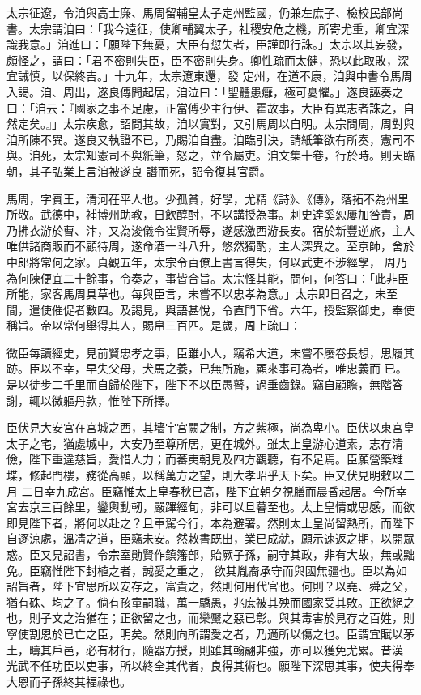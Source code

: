 \begin{pinyinscope}
 太宗征遼，令洎與高士廉、馬周留輔皇太子定州監國，仍兼左庶子、檢校民部尚書。太宗謂洎曰：「我今遠征，使卿輔翼太子，社稷安危之機，所寄尤重，卿宜深識我意。」洎進曰：「願陛下無憂，大臣有愆失者，臣謹即行誅。」太宗以其妄發，頗怪之，謂曰：「君不密則失臣，臣不密則失身。卿性疏而太健，恐以此取敗，深宜誡慎，以保終吉。」十九年，太宗遼東還，發
 定州，在道不康，洎與中書令馬周入謁。洎、周出，遂良傳問起居，洎泣曰：「聖體患癰，極可憂懼。」遂良誣奏之曰：「洎云：『國家之事不足慮，正當傅少主行伊、霍故事，大臣有異志者誅之，自然定矣。』」太宗疾愈，詔問其故，洎以實對，又引馬周以自明。太宗問周，周對與洎所陳不異。遂良又執證不已，乃賜洎自盡。洎臨引決，請紙筆欲有所奏，憲司不與。洎死，太宗知憲司不與紙筆，怒之，並令屬吏。洎文集十卷，行於時。則天臨朝，其子弘業上言洎被遂良
 譖而死，詔令復其官爵。



 馬周，字賓王，清河茌平人也。少孤貧，好學，尤精《詩》、《傳》，落拓不為州里所敬。武德中，補博州助教，日飲醇酎，不以講授為事。刺史達奚恕屢加咎責，周乃拂衣游於曹、汴，又為浚儀令崔賢所辱，遂感激西游長安。宿於新豐逆旅，主人唯供諸商販而不顧待周，遂命酒一斗八升，悠然獨酌，主人深異之。至京師，舍於中郎將常何之家。貞觀五年，太宗令百僚上書言得失，何以武吏不涉經學，
 周乃為何陳便宜二十餘事，令奏之，事皆合旨。太宗怪其能，問何，何答曰：「此非臣所能，家客馬周具草也。每與臣言，未嘗不以忠孝為意。」太宗即日召之，未至間，遣使催促者數四。及謁見，與語甚悅，令直門下省。六年，授監察御史，奉使稱旨。帝以常何舉得其人，賜帛三百匹。是歲，周上疏曰：



 微臣每讀經史，見前賢忠孝之事，臣雖小人，竊希大道，未嘗不廢卷長想，思履其跡。臣以不幸，早失父母，犬馬之養，已無所施，顧來事可為者，唯忠義而
 已。是以徒步二千里而自歸於陛下，陛下不以臣愚瞽，過垂齒錄。竊自顧瞻，無階答謝，輒以微軀丹款，惟陛下所擇。



 臣伏見大安宮在宮城之西，其墻宇宮闕之制，方之紫極，尚為卑小。臣伏以東宮皇太子之宅，猶處城中，大安乃至尊所居，更在城外。雖太上皇游心道素，志存清儉，陛下重違慈旨，愛惜人力；而蕃夷朝見及四方觀聽，有不足焉。臣願營築雉堞，修起門樓，務從高顯，以稱萬方之望，則大孝昭乎天下矣。臣又伏見明敕以二月
 二日幸九成宮。臣竊惟太上皇春秋已高，陛下宜朝夕視膳而晨昏起居。今所幸宮去京三百餘里，鑾輿動軔，嚴蹕經旬，非可以旦暮至也。太上皇情或思感，而欲即見陛下者，將何以赴之？且車駕今行，本為避署。然則太上皇尚留熱所，而陛下自逐涼處，溫凊之道，臣竊未安。然敕書既出，業已成就，願示速返之期，以開眾惑。臣又見詔書，令宗室勛賢作鎮籓部，貽厥子孫，嗣守其政，非有大故，無或黜免。臣竊惟陛下封植之者，誠愛之重之，
 欲其胤裔承守而與國無疆也。臣以為如詔旨者，陛下宜思所以安存之，富貴之，然則何用代官也。何則？以堯、舜之父，猶有硃、均之子。倘有孩童嗣職，萬一驕愚，兆庶被其殃而國家受其敗。正欲絕之也，則子文之治猶在；正欲留之也，而欒黶之惡已彰。與其毒害於見存之百姓，則寧使割恩於已亡之臣，明矣。然則向所謂愛之者，乃適所以傷之也。臣謂宜賦以茅土，疇其戶邑，必有材行，隨器方授，則雖其翰翮非強，亦可以獲免尤累。昔漢
 光武不任功臣以吏事，所以終全其代者，良得其術也。願陛下深思其事，使夫得奉大恩而子孫終其福祿也。




\end{pinyinscope}
